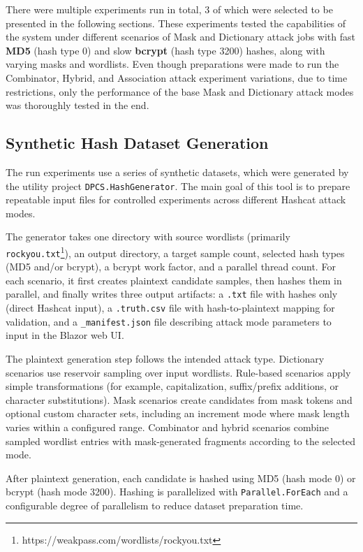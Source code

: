 There were multiple experiments run in total, 3 of which were selected to be presented in the following sections. These experiments tested the capabilities of the system under different scenarios of Mask and Dictionary attack jobs with fast \textbf{MD5} (hash type 0) and slow \textbf{bcrypt} (hash type 3200) hashes, along with varying masks and wordlists. Even though preparations were made to run the Combinator, Hybrid, and Association attack experiment variations, due to time restrictions, only the performance of the base Mask and Dictionary attack modes was thoroughly tested in the end.

\subsection{Synthetic Hash Dataset Generation}

The run experiments use a series of synthetic datasets, which were generated by the utility project \verb|DPCS.HashGenerator|. The main goal of this tool is to prepare repeatable input files for controlled experiments across different Hashcat attack modes.

The generator takes one directory with source wordlists (primarily \verb|rockyou.txt|\footnote{https://weakpass.com/wordlists/rockyou.txt}), an output directory, a target sample count, selected hash types (MD5 and/or bcrypt), a bcrypt work factor, and a parallel thread count. For each scenario, it first creates plaintext candidate samples, then hashes them in parallel, and finally writes three output artifacts: a \verb|.txt| file with hashes only (direct Hashcat input), a \verb|.truth.csv| file with hash-to-plaintext mapping for validation, and a \verb|_manifest.json| file describing attack mode parameters to input in the Blazor web UI.

The plaintext generation step follows the intended attack type. Dictionary scenarios use reservoir sampling over input wordlists. Rule-based scenarios apply simple transformations (for example, capitalization, suffix/prefix additions, or character substitutions). Mask scenarios create candidates from mask tokens and optional custom character sets, including an increment mode where mask length varies within a configured range. Combinator and hybrid scenarios combine sampled wordlist entries with mask-generated fragments according to the selected mode.

After plaintext generation, each candidate is hashed using MD5 (hash mode 0) or bcrypt (hash mode 3200). Hashing is parallelized with \verb|Parallel.ForEach| and a configurable degree of parallelism to reduce dataset preparation time.




